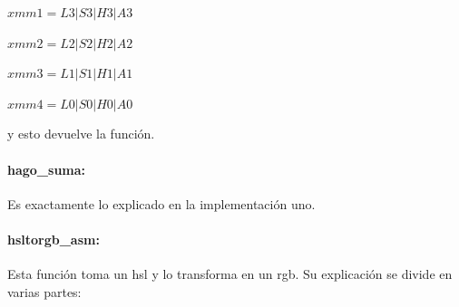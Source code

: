 \documentclass[a4paper]{article}
\begin{document}
\vspace*{0.3cm}	

$xmm1 = L3|S3|H3|A3$

\vspace*{0.3cm}

$xmm2 = L2|S2|H2|A2$

\vspace*{0.3cm}

$xmm3 = L1|S1|H1|A1$

\vspace*{0.3cm}

$xmm4 = L0|S0|H0|A0$

\vspace*{0.3cm}

y esto devuelve la función.

\paragraph{hago_suma:}

Es exactamente lo explicado en la implementación uno.


\paragraph*{hsltorgb_asm:}

Esta función toma un hsl y lo transforma en un rgb. Su explicación se divide en varias partes:
\end{document}
